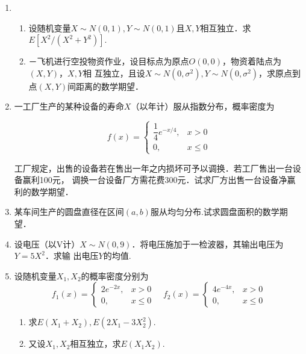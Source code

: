 \documentclass[10pt,a4paper]{article}
\begin{document}
\begin{enumerate}
    \item \begin{enumerate}
        \item 设随机变量$X\sim N(0,1),Y\sim N(0,1)$且$X,Y$相互独立．求$E[X^2/(X^2+Y^2)]$.
        \item －飞机进行空投物资作业，设目标点为原点$O(0,0)$，物资着陆点为$(X,Y)$，$X,Y$相
        互独立，且设$X\sim N(0,\sigma^2),Y\sim N(0,\sigma^2)$，求原点到点$(X,Y)$间距离的数学期望．
    \end{enumerate}
    \vspace{10cm}


    \item 一工厂生产的某种设备的寿命$X$（以年计）服从指数分布，概率密度为
    \vspace{-0.5cm}
    \begin{spacing}{2.0}
    $$f(x)=\left\{\begin{array}{ll} 
        \dfrac{1}{4}e^{-x/4}, & x>0\\
        0, & x\leq 0
    \end{array}\right.$$
    \end{spacing}
    \vspace{-0.5cm}
    工厂规定，出售的设备若在售出一年之内损坏可予以调换．若工厂售出一台设备赢利100元，
    调换一台设备厂方需花费300元．试求厂方出售一台设备净赢利的数学期望．
    \vspace{10cm}




    \item 某车间生产的圆盘直径在区间$(a,b)$服从均匀分布.试求圆盘面积的数学期望．
    \vspace{10cm}


    \item 设电压（以V计）$X\sim N(0,9)$．将电压施加于一检波器，其输出电压为$Y=5X^2$．求输
    出电压$Y$的均值.
    \vspace{10cm}

    \item 设随机变量$X_1,X_2$的概率密度分别为
    $$f_1(x)=\left\{\begin{array}{ll}
        2e^{-2x}, & x>0\\
        0, & x\leq 0
    \end{array}\right.\quad
    f_2(x)=\left\{\begin{array}{ll}
        4e^{-4x}, & x>0\\
        0, & x\leq 0
    \end{array}\right.$$
    \begin{enumerate}
        \item 求$E(X_1+X_2),E(2X_1-3X_2^2)$.
        \item 又设$X_1,X_2$相互独立，求$E(X_1X_2)$.
    \end{enumerate}
    \vspace{10cm}




\end{enumerate}
\end{document}
